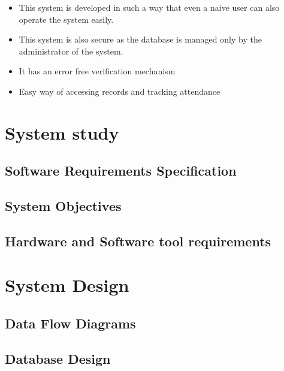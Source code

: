 \documentclass{article}
\begin{document}
\begin{itemize}
\item This system is developed in such a way that even a naive user can also operate the system easily.
\item This system is also secure as the database is managed only by
the administrator of the system.
\item It has an error free verification mechanism
\item Easy way of accessing records and tracking attendance
\end{itemize}


\newpage

\section{System study}
\vspace{1em}

\subsection{Software Requirements Specification}
\vspace{1em}
\subsection{System Objectives}
\vspace{1em}
\subsection{Hardware and Software tool requirements}
\vspace{1em}

\vspace{1em}

\newpage

\section{System Design}
\vspace{1em}

\subsection{Data Flow Diagrams}
\vspace{1em}
\subsection{Database Design}
\vspace{1em}
\end{document}
